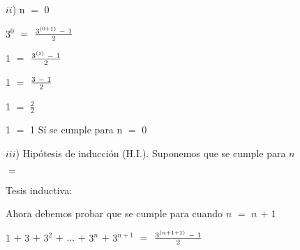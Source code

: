 \documentclass[12pt]{article}
\begin{document}
{\textcolor{verde_manzana}{$ii$)  n $=$ 0}} \vspace{0.2cm}

\hspace{4cm} 3$^{0}$ $=$ {\LARGE{{$\frac{3^{(0+1)} \hspace{0.1cm} - \hspace{0.1cm} 1}{2}$}}} \vspace{0.2cm}

\hspace{4cm} 1 $=$ {\LARGE{{$\frac{3^{(1)} \hspace{0.1cm} - \hspace{0.1cm} 1}{2}$}}} \vspace{0.2cm}

\hspace{4cm} 1 $=$ {\LARGE{{$\frac{3 \hspace{0.1cm} - \hspace{0.1cm} 1}{2}$}}} \vspace{0.2cm}

\hspace{4cm} 1 $=$ {\LARGE{{$\frac{2}{2}$}}} \vspace{0.2cm}

\hspace{4.2cm} 1 $=$ 1 \hspace{0.2cm} Sí se cumple para n $=$ 0 \vspace{0.2cm}

{\textcolor{verde_manzana}{$iii$) Hipótesis de inducción (H.I.). }} Suponemos que se cumple para $n$\vspace{0.2cm} 
 
\hspace{4cm} {} $=$  {} \vspace{0.2cm}
 
{\textcolor{verde_manzana}{Tesis inductiva:}}  \vspace{0.2cm}
 
Ahora debemos probar que se cumple para cuando $n$ $=$ $n$ $+$ $1$ \vspace{0.2cm}
 
\hspace{2cm} 1 $+$ 3 $+$ 3$^{2}$ $+$ $...$ $+$ 3$^{n}$ $+$ 3$^{n+1}$ $=$ {\LARGE{{$\frac{3^{(n+1+1)} \hspace{0.1cm} - \hspace{0.1cm} 1}{2}$}}} \vspace{0.2cm} 
\end{document}
